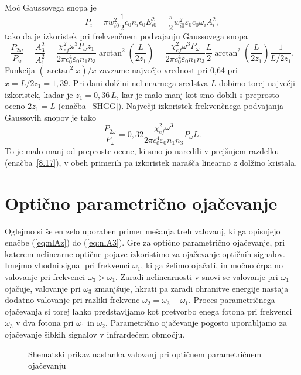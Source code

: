 Moč Gaussovega snopa je
\begin{equation}
P_{i}=\pi w_{i0}^{2} \frac{1}{2}c_0 n_i \epsilon_{0}E_{i0}^{2}=
\frac{\pi}{2}w_{i0}^{2}\varepsilon_0 c_0 \omega_{i} A_{i}^{2},
\label{8.26}
\end{equation}
tako da je izkoristek pri frekvenčnem podvajanju Gaussovega snopa 
\begin{equation}
\frac{P_{2\omega}}{P_{\omega}}=\frac{A_3^2}{A_1^2} = 
\frac{\chi_{ef}^2 \omega^3 P_\omega z_1}{2 \pi c_0^4 \varepsilon_0 n_1 n_3} 
\arctan^2 \left( \frac{L}{2z_1}\right)
= \frac{\chi_{ef}^2 \omega^3 P_\omega}{2 \pi c_0^4 \varepsilon_0 n_1 n_3} \frac{L}{2}
\arctan^2 \left( \frac{L}{2z_1}\right) \frac{1}{L/2z_1}.
\label{8.27}
\end{equation}
Funkcija $(\arctan^{2}x)/x$ zavzame največjo vrednost pri 0,64 pri $x =L/2z_1=1,39$.
Pri dani dolžini nelinearnega sredstva $L$ dobimo torej največji
izkoristek, kadar je $z_{1}=0,36\,L$, kar je malo manj kot smo dobili
s preprosto oceno $2z_{1}=L$ (enačba~\ref{SHGG}). Največji izkoristek
frekvenčnega podvajanja Gaussovih snopov je tako
\begin{equation}
\frac{P_{2\omega}}{P_{\omega}}
= 0,32 \frac{\chi_{ef}^2 \omega^3 }{2 \pi c_0^4 \varepsilon_0 n_1 n_3} P_\omega L.
\label{8.28}
\end{equation}
To je malo manj od preproste ocene, ki smo jo naredili v prejšnjem razdelku (enačba~\ref{8.17}),
v obeh primerih pa izkoristek narašča linearno z dolžino kristala.

\section{Optično parametrično ojačevanje}

Oglejmo si še en zelo uporaben primer mešanja treh valovanj, 
ki ga opisujejo enačbe (\ref{eq:nlAz}) do (\ref{eq:nlA3}). Gre za
optično parametrično ojačevanje, pri katerem nelinearne optične pojave
izkoristimo za ojačevanje optičnih signalov. Imejmo vhodni
signal pri frekvenci $\omega_{1}$, ki ga želimo ojačati, in močno črpalno valovanje
pri frekvenci $\omega_{3}>\omega_{1}$. Zaradi nelinearnosti v snovi se 
valovanje pri $\omega_{1}$ ojačuje, valovanje pri $\omega_{3}$ zmanjšuje, hkrati pa zaradi
ohranitve energije nastaja dodatno valovanje pri razliki frekvenc
$\omega_{2}=\omega_{3}-\omega_{1}$. Proces parametričnega ojačevanja 
si torej lahko predstavljamo kot pretvorbo enega fotona pri frekvenci 
$\omega_{3}$ v dva fotona pri $\omega_{1}$ in $\omega_{2}$.
Parametrično ojačevanje pogosto uporabljamo za ojačevanje šibkih signalov 
v infrardečem območju.
\begin{figure}[h]
\centering
\def\svgwidth{100truemm} 

\caption{Shematski prikaz nastanka valovanj pri optičnem parametričnem ojačevanju}
\label{fig:opa2}
\end{figure}

